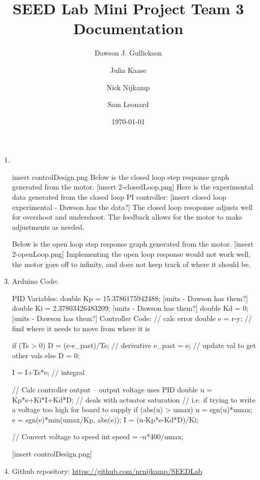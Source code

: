 \documentclass{article}
\title{SEED Lab Mini Project Team 3 Documentation}
\author{
    Dawson J. Gullickson
    \and
    Julia Kaase
    \and
    Nick Nijkamp
    \and
    Sam Leonard
}
\date{\today}
\begin{document}
    \maketitle
	
    \begin{enumerate}
        \item 
        
        \item 
            [insert controlDesign.png]
        Below is the closed loop step response graph generated from the motor.
            [insert 2-closedLoop.png]
        Here is the experimental data generated from the closed loop PI controller:
            [insert closed loop experimental - Dawson has the data?]
        The closed loop resoponse adjusts well for overshoot and undershoot. The feedback allows for the motor to maks adjustments as needed. 

        Below is the open loop step response graph generated from the motor.
            [insert 2-openLoop.png]
        Implementing the open loop response would not work well, the motor goes off to infinity, and does not keep track of where it should be. 
        \item 
        Arduino Code:

            PID Variables:
            double Kp = 15.3786175942488; [units - Dawson has them?]
            double Ki = 2.37803426483209; [units - Dawson has them?] 
            double Kd = 0; [units - Dawson has them?]
            Controller Code:
                    // calc error
                double e = r-y; // find where it needs to move from where it is

                if (Ts > 0) {
                    D = (e-e_past)/Ts; // derivative
                    e_past = e; // update val to get other vals
                } else {
                    D = 0;
                }

                I = I+Ts*e; // integral

                // Calc controller output -- output voltage uses PID
                double u = Kp*e+Ki*I+Kd*D;
                // deals with actuator saturation
                // i.e. if trying to write a voltage too high for board to supply
                if (abs(u) > umax) {
                    u = sgn(u)*umax;
                    e = sgn(e)*min(umax/Kp, abs(e));
                    I = (u-Kp*e-Kd*D)/Ki; 
                }
                
                // Convert voltage to speed
                int speed = -u*400/umax;

            [insert controlDesign.png]

        \item Github repository: \url{https://github.com/nrnijkamp/SEEDLab}
    \end{enumerate}
\end{document}
